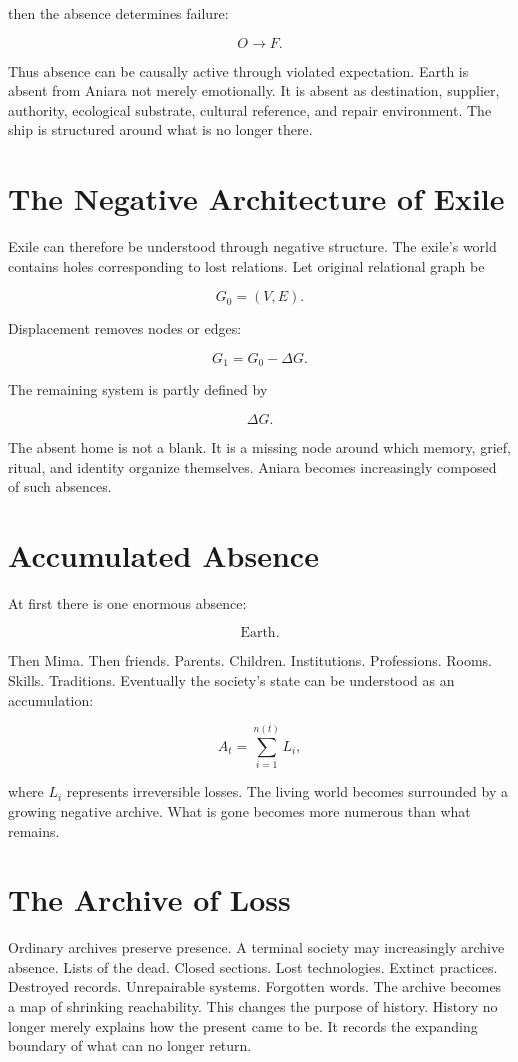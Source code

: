 \documentclass[11pt,oneside]{book}
\theoremstyle{definition}
\theoremstyle{remark}
\begin{document}
then the absence determines failure:

\[
O\rightarrow F.
\]

Thus absence can be causally active through violated expectation. Earth is absent from Aniara not
merely emotionally. It is absent as destination, supplier, authority, ecological substrate, cultural
reference, and repair environment. The ship is structured around what is no longer there.

\section{The Negative Architecture of Exile}

Exile can therefore be understood through negative structure. The exile's world contains holes
corresponding to lost relations. Let original relational graph be

\[
G_0=(V,E).
\]

Displacement removes nodes or edges:

\[
G_1=G_0-\Delta G.
\]

The remaining system is partly defined by

\[
\Delta G.
\]

The absent home is not a blank. It is a missing node around which memory, grief, ritual, and
identity organize themselves. Aniara becomes increasingly composed of such absences.

\section{Accumulated Absence}

At first there is one enormous absence:

\[
\text{Earth}.
\]

Then Mima. Then friends. Parents. Children. Institutions. Professions. Rooms. Skills. Traditions.
Eventually the society's state can be understood as an accumulation:

\[
A_t = \sum_{i=1}^{n(t)} L_i,
\]

where \(L_i\) represents irreversible losses. The living world becomes surrounded by a growing
negative archive. What is gone becomes more numerous than what remains.

\section{The Archive of Loss}

Ordinary archives preserve presence. A terminal society may increasingly archive absence. Lists of
the dead. Closed sections. Lost technologies. Extinct practices. Destroyed records. Unrepairable
systems. Forgotten words. The archive becomes a map of shrinking reachability. This changes the
purpose of history. History no longer merely explains how the present came to be. It records the
expanding boundary of what can no longer return.
\end{document}
